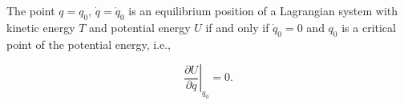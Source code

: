 The point $q = q_0$, $\dot{q} = \dot{q}_0$ is an equilibrium position of a Lagrangian system with kinetic energy $T$ and potential energy $U$ if and only if $\dot{q}_0 = 0$ and $q_0$ is a critical point of the potential energy, i.e.,

$$\left. \frac{\partial U}{\partial q} \right|_{q_0} = 0.$$
